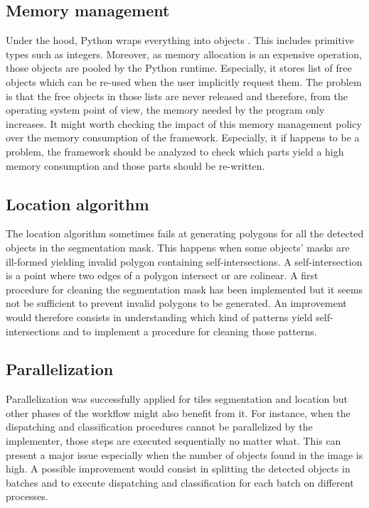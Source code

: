 \subsection{Memory management}
Under the hood, Python wraps everything into objects \cite{pythonleaks2016}. This includes primitive types such as integers. Moreover, as memory allocation is an expensive operation, those objects are pooled by the Python runtime. Especially, it stores list of free objects which can be re-used when the user implicitly request them. The problem is that the free objects in those lists are never released and therefore, from the operating system point of view, the memory needed by the program only increases. It might worth checking the impact of this memory management policy over the memory consumption of the framework. Especially, it if happens to be a problem, the framework should be analyzed to check which parts yield a high memory consumption and those parts should be re-written.

\subsection{Location algorithm}
The location algorithm sometimes fails at generating polygons for all the detected objects in the segmentation mask. This happens when some objects' masks are ill-formed yielding invalid polygon containing self-intersections. A self-intersection is a point where two edges of a polygon intersect or are colinear. A first procedure for cleaning the segmentation mask has been implemented but it seems not be sufficient to prevent invalid polygons to be generated. An improvement would therefore consists in understanding which kind of patterns yield self-intersections and to implement a procedure for cleaning those patterns. 

\subsection{Parallelization}
\label{ssec:work_improve_parall}
Parallelization was successfully applied for tiles segmentation and location but other phases of the workflow might also benefit from it. For instance, when the dispatching and classification procedures cannot be parallelized by the implementer, those steps are executed sequentially no matter what. This can present a major issue especially when the number of objects found in the image is high. A possible improvement would consist in splitting the detected objects in batches and to execute dispatching and classification for each batch on different processes. 

